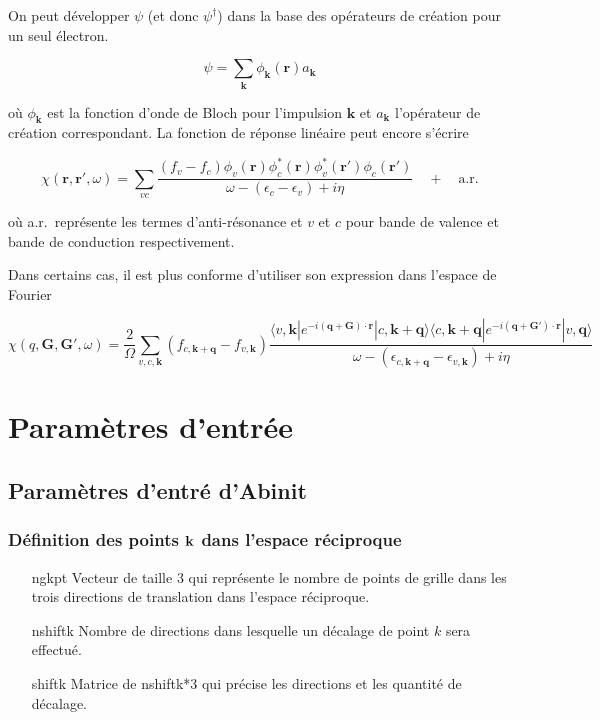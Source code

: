 On peut développer $\psi$ (et donc $\psi^\dagger$) dans la base des opérateurs de création
pour un seul électron.

$$
\psi = \sum_\textbf{k} \phi_\textbf{k}(\textbf{r}) a_\textbf{k}
$$

où $\phi_\textbf{k}$ est la fonction d'onde de Bloch pour l'impulsion $\textbf{k}$ et $a_\textbf{k}$ l'opérateur de création correspondant. La fonction de réponse linéaire peut encore s'écrire

\begin{equation}\label{chi}
  \chi(\textbf{r}, \textbf{r}', \omega) = \sum_{vc} \frac{(f_v - f_c)\phi_v(\textbf{r}) \phi_c^*(\textbf{r}) \phi_v^*(\textbf{r}') \phi_c(\textbf{r}')}{\omega - (\epsilon_c - \epsilon_v) + i\eta} \quad + \quad \text{a.r.}
\end{equation}

où a.r.\ représente les termes d'anti-résonance et $v$ et $c$ pour bande de valence et bande de conduction respectivement.

Dans certains cas, il est plus conforme d'utiliser son expression dans l'espace de Fourier

\begin{equation}\label{chi_q}
\chi(q, \textbf{G}, \textbf{G}', \omega) = \frac{2}{\Omega}\sum_{v,c,\textbf{k}}(f_{c,\textbf{k}+\textbf{q}} - f_{v,\textbf{k}}) \frac{\langle v, \textbf{k} | e^{-i(\textbf{q}+\textbf{G})\cdot\textbf{r}} |c , \textbf{k}+\textbf{q} \rangle  \langle c, \textbf{k}+\textbf{q} | e^{-i(\textbf{q}+\textbf{G}')\cdot\textbf{r}} |v , \textbf{q}\rangle}{\omega - (\epsilon_{c, \textbf{k}+\textbf{q}} - \epsilon_{v,\textbf{k}}) + i\eta}
\end{equation}

\chapter{Paramètres d'entrée}
\section{Paramètres d'entré d'Abinit}
\subsection{Définition des points $\vb{k}$ dans l'espace réciproque}
\begin{itemize}[labelwidth=, leftmargin=+, font=\bfseries]
  \item[ngkpt] Vecteur de taille 3 qui représente le nombre de points de grille dans les trois directions de translation dans l'espace réciproque.
  \item[nshiftk] Nombre de directions dans lesquelle un décalage de point $k$ sera effectué.
  \item[shiftk] Matrice de nshiftk*3 qui précise les directions et les quantité de décalage.
\end{itemize}
